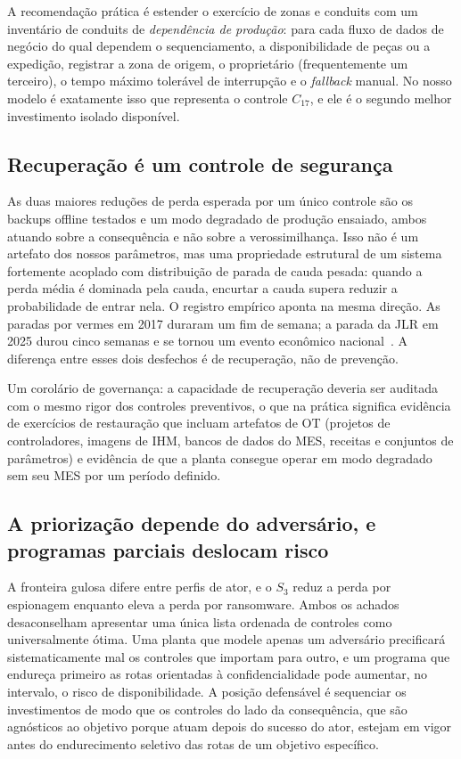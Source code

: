 A recomendação prática é estender o exercício de zonas e conduits com um
inventário de conduits de \emph{dependência de produção}: para cada fluxo de
dados de negócio do qual dependem o sequenciamento, a disponibilidade de peças
ou a expedição, registrar a zona de origem, o proprietário (frequentemente um
terceiro), o tempo máximo tolerável de interrupção e o \emph{fallback} manual.
No nosso modelo é exatamente isso que representa o controle $C_{17}$, e ele é o
segundo melhor investimento isolado disponível.

\subsection{Recuperação é um controle de segurança}

As duas maiores reduções de perda esperada por um único controle são os backups
offline testados e um modo degradado de produção ensaiado, ambos atuando sobre a consequência e
não sobre a verossimilhança. Isso não é um artefato dos
nossos parâmetros, mas uma propriedade estrutural de um sistema fortemente
acoplado com distribuição de parada de cauda pesada: quando a perda média é
dominada pela cauda, encurtar a cauda supera reduzir a probabilidade de entrar
nela. O registro empírico aponta na mesma direção. As paradas por vermes em
2017 duraram um fim de semana; a parada da JLR em 2025 durou cinco semanas e se
tornou um evento econômico nacional~\cite{inc18cmc}. A diferença entre esses
dois desfechos é de recuperação, não de prevenção.

Um corolário de governança: a capacidade de recuperação deveria ser auditada
com o mesmo rigor dos controles preventivos, o que na prática significa
evidência de exercícios de restauração que incluam artefatos de OT (projetos de controladores, imagens de IHM, bancos
de dados do MES, receitas e conjuntos de parâmetros) e evidência de que a
planta consegue operar em modo degradado
sem seu MES por um período definido.

\subsection{A priorização depende do adversário, e programas parciais deslocam
risco}

A fronteira gulosa difere entre perfis de ator, e o $S_3$ reduz a perda por
espionagem enquanto eleva a perda por ransomware. Ambos os achados desaconselham
apresentar uma única lista ordenada de controles como universalmente ótima. Uma
planta que modele apenas um adversário precificará sistematicamente mal os
controles que importam para outro, e um programa que endureça primeiro as rotas
orientadas à confidencialidade pode aumentar, no intervalo, o risco de
disponibilidade. A posição defensável é sequenciar os investimentos de modo que
os controles do lado da consequência, que são agnósticos ao objetivo porque
atuam depois do sucesso do ator, estejam em vigor antes do endurecimento
seletivo das rotas de um objetivo específico.

